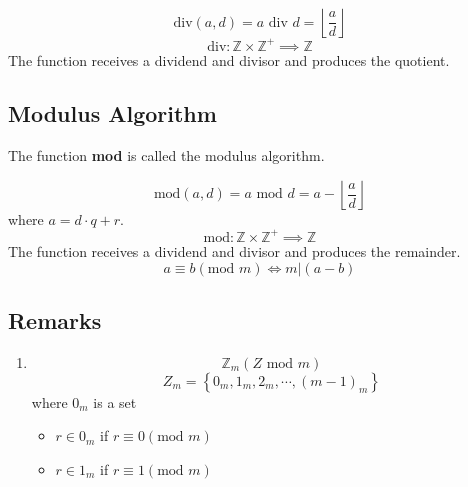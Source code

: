 \documentclass{article}
\begin{document}
\begin{equation}
	\text{div}(a, d) = a \text{ div } d = \left\lfloor \frac{ a }{ d } \right\rfloor
\end{equation}
\begin{equation}
	\text{div}: \mathbb{Z} \times \mathbb{Z}^{+} \implies \mathbb{Z}
\end{equation}
The function receives a dividend and divisor and produces the quotient.

\subsection{Modulus Algorithm}

The function \textbf{mod} is called the modulus algorithm.

\begin{equation}
	\text{mod}(a, d) = a \text{ mod } d = a - \left\lfloor \frac{ a }{ d } \right\rfloor
\end{equation}
where $ a = d \cdot q + r $.
\begin{equation}
	\text{mod}: \mathbb{Z} \times \mathbb{Z}^{+} \implies \mathbb{Z}
\end{equation}
The function receives a dividend and divisor and produces the remainder.
\begin{equation}
	a \equiv b \left( \text{mod } m \right) \iff m \vert \left( a - b \right)
\end{equation}

\subsection{Remarks}

\begin{enumerate}
	\item
	      \begin{equation*}
		      \mathbb{Z}_{m} \left( Z \text{ mod } m \right)
	      \end{equation*}
	      \begin{equation*}
		      Z_{m} = \left\{ 0_m, 1_m, 2_m, \cdots, (m - 1)_m \right\}
	      \end{equation*}
	      where $ 0_m $ is a set
	      \begin{itemize}
		      \item $ r \in 0_m $ if $ r \equiv 0 \left( \text{mod } m \right) $
		      \item $ r \in 1_m $ if $ r \equiv 1 \left( \text{mod } m \right) $
	      \end{itemize}
\end{enumerate}
\end{document}

